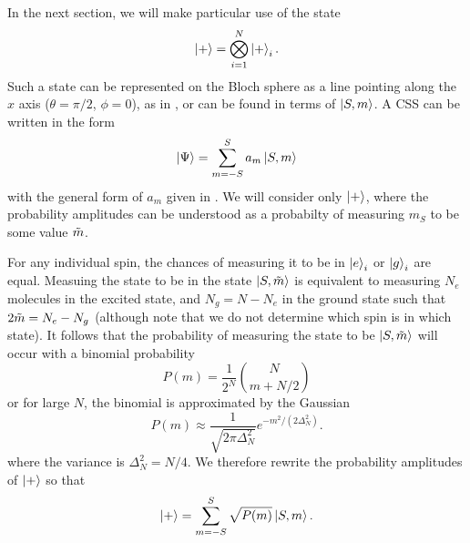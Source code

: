 In the next section, we will make particular use of the state
%
\begin{equation}
  \ket{+} = \bigotimes_{i=1}^N \ket{+}_i.
\end{equation}
%
Such a state can be represented on the Bloch sphere as a line pointing along
the $x$ axis ($\theta=\pi/2$, $\phi=0$), as in , or can be
found in terms of $\ket{S,m}$. A CSS can be written in the form 
%
\begin{equation}
  \ket{\Psi} = \sum_{m=-S}^S a_m \ket{S, m}
\end{equation}
%
with the general form of $a_m$ given in . We will
consider only $\ket{+}$, where the probability amplitudes can be understood as
a probabilty of measuring $m_S$ to be some value $\tilde{m}$.

For any individual spin, the chances of measuring it to be in $\ket{e}_i$ or
$\ket{g}_i$ are equal. Measuing the state to be in the state $\ket{S, \tilde{m}}$
is equivalent to measuring $N_e$ molecules in the excited state, and $N_g = N -
N_e$ in the ground state such that $2\tilde{m} = N_e - N_g$ (although note that
we do not determine which spin is in which state). It follows that the
probability of measuring the state to be $\ket{S,\tilde{m}}$ will occur with a
binomial probability~\cite{Gazeau2009}
%
\begin{equation}
  P(m) = \frac{1}{2^N} \binom{N}{m+N/2}
\end{equation}
%
or for large $N$, the binomial is approximated by the Gaussian
%
\begin{equation}
  P(m) \approx\frac{1}{\sqrt{2\pi \Delta_N^2}} e^{-m^2/(2\Delta_N^2)}.
  \label{squeeze:eqn:CSSmprob}
\end{equation}
%
where the variance is $\Delta_N^2 = N/4$. We therefore rewrite the probability
amplitudes of $\ket{+}$ so that
%
\begin{equation}
  \ket{+} = \sum_{m=-S}^S \sqrt{P(m)}\ket{S,m}.
  \label{squeeze:eqn:plusdicke}
\end{equation}

